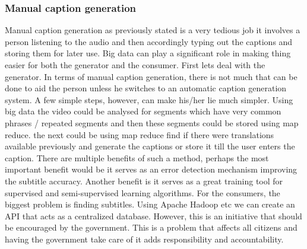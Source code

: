\documentclass[sigconf]{acmart}
\begin{document}
\subsubsection{Manual caption generation}
Manual caption generation as previously stated is a very tedious job it involves a person listening to the audio and then accordingly typing out the captions and storing them for later use. Big data can play a significant role in making thing easier for both the generator and the consumer. First lets deal with the generator. In terms of manual caption generation, there is not much that can be done to aid the person unless he switches to an automatic caption generation system. A few simple steps, however, can make his/her lie much simpler. Using big data the video could be analysed for segments which have very common phrases / repeated segments and then these segments could be stored using map reduce. the next could be using map reduce find if there were translations available previously and generate the captions or store it till the user enters the caption. There are multiple benefits of such a method, perhaps the most important benefit would be it serves as an error detection mechanism improving the subtitle accuracy. Another benefit is it serves as a great training tool for supervised and semi-supervised learning algorithms. For the consumers, the biggest problem is finding subtitles. Using Apache Hadoop etc we can create an API that acts as a centralized database. However, this is an initiative that should be encouraged by the government. This is a problem that affects all citizens and having the government take care of it adds responsibility and accountability.
\end{document}
